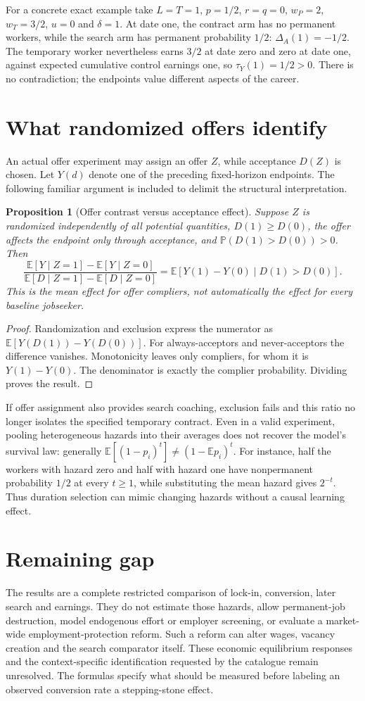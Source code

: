 \documentclass[11pt,a4paper]{article}
\newtheorem{proposition}[theorem]{Proposition}
\theoremstyle{definition}
\theoremstyle{remark}
\newcommand{\E}{\mathbb E}
\newcommand{\Prb}{\mathbb P}
\begin{document}
For a concrete exact example take $L=T=1$, $p=1/2$, $r=q=0$, $w_P=2$, $w_T=3/2$, $u=0$ and $\delta=1$. At date one, the contract arm has no permanent workers, while the search arm has permanent probability $1/2$: $\Delta_A(1)=-1/2$. The temporary worker nevertheless earns $3/2$ at date zero and zero at date one, against expected cumulative control earnings one, so $\tau_Y(1)=1/2>0$. There is no contradiction; the endpoints value different aspects of the career.

\section{What randomized offers identify}
An actual offer experiment may assign an offer $Z$, while acceptance $D(Z)$ is chosen. Let $Y(d)$ denote one of the preceding fixed-horizon endpoints. The following familiar argument is included to delimit the structural interpretation.

\begin{proposition}[Offer contrast versus acceptance effect]
Suppose $Z$ is randomized independently of all potential quantities, $D(1)\geq D(0)$, the offer affects the endpoint only through acceptance, and $\Prb(D(1)>D(0))>0$. Then
\[
 \frac{\E[Y\mid Z=1]-\E[Y\mid Z=0]}
      {\E[D\mid Z=1]-\E[D\mid Z=0]}
 =\E[Y(1)-Y(0)\mid D(1)>D(0)].
\]
This is the mean effect for offer compliers, not automatically the effect for every baseline jobseeker.
\end{proposition}
\begin{proof}
Randomization and exclusion express the numerator as
$\E[Y(D(1))-Y(D(0))]$. For always-acceptors and never-acceptors the difference vanishes. Monotonicity leaves only compliers, for whom it is $Y(1)-Y(0)$. The denominator is exactly the complier probability. Dividing proves the result.
\end{proof}

If offer assignment also provides search coaching, exclusion fails and this ratio no longer isolates the specified temporary contract. Even in a valid experiment, pooling heterogeneous hazards into their averages does not recover the model's survival law: generally $\E[(1-p_i)^t]\ne(1-\E p_i)^t$. For instance, half the workers with hazard zero and half with hazard one have nonpermanent probability $1/2$ at every $t\geq1$, while substituting the mean hazard gives $2^{-t}$. Thus duration selection can mimic changing hazards without a causal learning effect.

\section{Remaining gap}
The results are a complete restricted comparison of lock-in, conversion, later search and earnings. They do not estimate those hazards, allow permanent-job destruction, model endogenous effort or employer screening, or evaluate a market-wide employment-protection reform. Such a reform can alter wages, vacancy creation and the search comparator itself. These economic equilibrium responses and the context-specific identification requested by the catalogue remain unresolved. The formulas specify what should be measured before labeling an observed conversion rate a stepping-stone effect.
\end{document}
